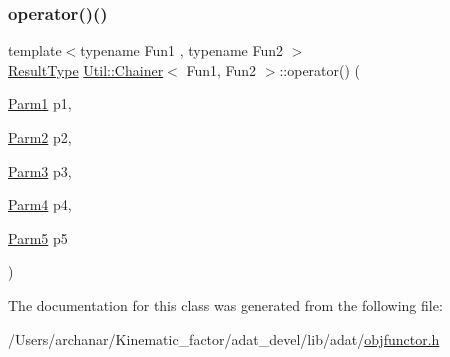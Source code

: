 \mbox{\label{classUtil_1_1Chainer_a3aee5b0f14ad8a15d167dd319019a01a}} 
\subsubsection{\texorpdfstring{operator()()}{operator()()}\hspace{0.1cm}{\footnotesize\ttfamily [12/12]}}
{\footnotesize\ttfamily template$<$typename Fun1 , typename Fun2 $>$ \\
\mbox{\hyperlink{classUtil_1_1Chainer_a2c8d88a77b8ba93eb915dc799ddafbb9}{Result\+Type}} \mbox{\hyperlink{classUtil_1_1Chainer}{Util\+::\+Chainer}}$<$ Fun1, Fun2 $>$\+::operator() (\begin{DoxyParamCaption}\item[{\mbox{\hyperlink{classUtil_1_1Chainer_a3e09b2267dabdd8d12070b09c47749c6}{Parm1}}}]{p1,  }\item[{\mbox{\hyperlink{classUtil_1_1Chainer_a1bfb0e8f35679278c85d232a74a107ff}{Parm2}}}]{p2,  }\item[{\mbox{\hyperlink{classUtil_1_1Chainer_ac28811d7153f7b7cf837f7b8626436c8}{Parm3}}}]{p3,  }\item[{\mbox{\hyperlink{classUtil_1_1Chainer_a82e756f3083e3883a05644425474f789}{Parm4}}}]{p4,  }\item[{\mbox{\hyperlink{classUtil_1_1Chainer_ac5fdddd223aac1cfb37abd6d681ddf69}{Parm5}}}]{p5 }\end{DoxyParamCaption})\hspace{0.3cm}{\ttfamily [inline]}}



The documentation for this class was generated from the following file\+:\begin{DoxyCompactItemize}
\item 
/\+Users/archanar/\+Kinematic\+\_\+factor/adat\+\_\+devel/lib/adat/\mbox{\hyperlink{lib_2adat_2objfunctor_8h}{objfunctor.\+h}}\end{DoxyCompactItemize}
